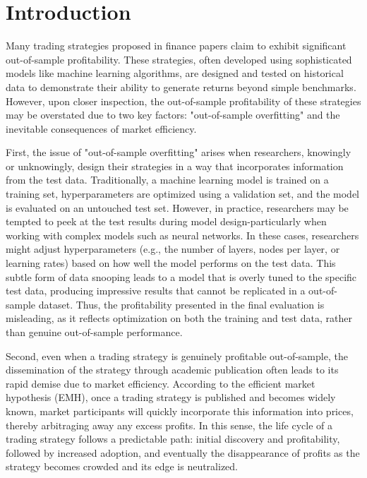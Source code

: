 \section{Introduction}

Many trading strategies proposed in finance papers claim to exhibit significant out-of-sample profitability. These strategies, often developed using sophisticated models like machine learning algorithms, are designed and tested on historical data to demonstrate their ability to generate returns beyond simple benchmarks. However, upon closer inspection, the out-of-sample profitability of these strategies may be overstated due to two key factors: "out-of-sample overfitting" and the inevitable consequences of market efficiency.

First, the issue of "out-of-sample overfitting" arises when researchers, knowingly or unknowingly, design their strategies in a way that incorporates information from the test data. Traditionally, a machine learning model is trained on a training set, hyperparameters are optimized using a validation set, and the model is evaluated on an untouched test set. However, in practice, researchers may be tempted to peek at the test results during model design-particularly when working with complex models such as neural networks. In these cases, researchers might adjust hyperparameters (e.g., the number of layers, nodes per layer, or learning rates) based on how well the model performs on the test data. This subtle form of data snooping leads to a model that is overly tuned to the specific test data, producing impressive results that cannot be replicated in a  out-of-sample dataset. Thus, the profitability presented in the final evaluation is misleading, as it reflects optimization on both the training and test data, rather than genuine out-of-sample performance.

Second, even when a trading strategy is genuinely profitable out-of-sample, the dissemination of the strategy through academic publication often leads to its rapid demise due to market efficiency. According to the efficient market hypothesis (EMH), once a trading strategy is published and becomes widely known, market participants will quickly incorporate this information into prices, thereby arbitraging away any excess profits. In this sense, the life cycle of a trading strategy follows a predictable path: initial discovery and profitability, followed by increased adoption, and eventually the disappearance of profits as the strategy becomes crowded and its edge is neutralized.

